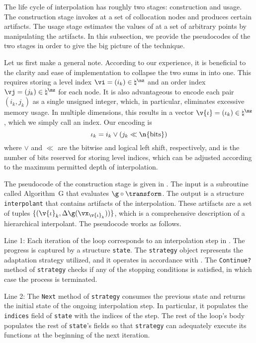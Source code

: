 The life cycle of interpolation has roughly two stages: construction and usage.
The construction stage invokes \g at a set of collocation nodes and produces
certain artifacts. The usage stage estimates the values of \g at a set of
arbitrary points by manipulating the artifacts. In this subsection, we provide
the pseudocodes of the two stages in order to give the big picture of the
technique.

Let us first make a general note. According to our experience, it is beneficial
to the clarity and ease of implementation to collapse the two sums in
 into one. This requires storing a level index $\vi =
(i_k) \in \natural^\nz$ and an order index $\vj = (j_k) \in \natural^\nz$ for
each node. It is also advantageous to encode each pair $(i_k, j_k)$ as a single
unsigned integer, which, in particular, eliminates excessive memory usage. In
multiple dimensions, this results in a vector $\v{\iota} = (\iota_k) \in
\natural^\nz$, which we simply call an index. Our encoding is
\[
  \iota_k = i_k \lor (j_k \ll \n{\mathrm{bits}})
\]
where $\lor$ and $\ll$ are the bitwise  and logical left shift,
respectively, and  is the number of bits reserved for storing
level indices, which can be adjusted according to the maximum permitted depth of
interpolation.

The pseudocode of the construction stage is given in .
The input is a subroutine called Algorithm~G that evaluates $\g \circ
\transform$. The output is a structure \texttt{interpolant} that contains
artifacts of the interpolation. These artifacts are a set of tuples $\{
(\v{\iota}_k, \Delta\g(\vx_{\v{\iota}_k})) \}$, which is a comprehensive
description of a hierarchical interpolant. The pseudocode works as follows.

Line 1: Each iteration of the loop corresponds to an interpolation step \ls in
. The progress is captured by a structure
\texttt{state}. The \texttt{strategy} object represents the adaptation strategy
utilized, and it operates in accordance with . The
\texttt{Continue?} method of \texttt{strategy} checks if any of the stopping
conditions is satisfied, in which case the process is terminated.

Line 2: The \texttt{Next} method of \texttt{strategy} consumes the previous
state and returns the initial state of the ongoing interpolation step. In
particular, it populates the \texttt{indices} field of \texttt{state} with the
indices of the step. The rest of the loop's body populates the rest of
\texttt{state}'s fields so that \texttt{strategy} can adequately execute its
functions at the beginning of the next iteration.

